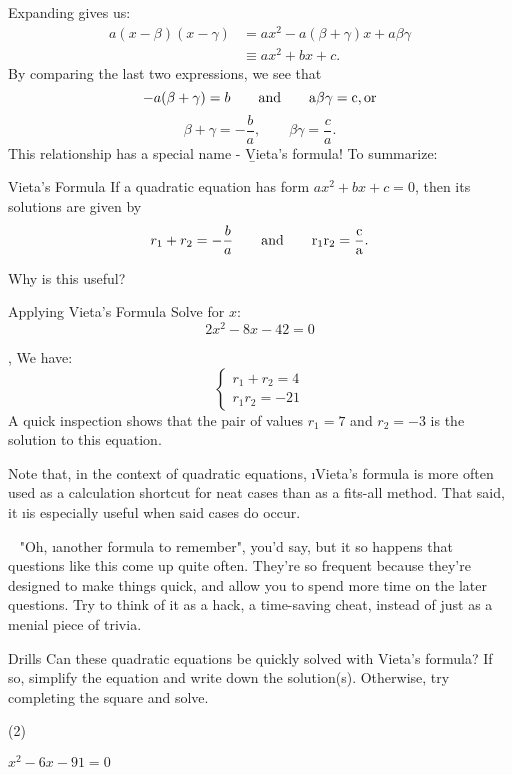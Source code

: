 \documentclass[../../main.tex]{subfiles}
\begin{document}
Expanding gives us:
\begin{align}
    a(x-\beta)(x-\gamma)
    &= ax^2-a(\beta+\gamma)x+a\beta\gamma \\
    &\equiv ax^2+bx+c.
\end{align}
By comparing the last two expressions, we see that
$$-a(\beta+\gamma)=b\qquad\rm{and}\qquad a\beta\gamma=c\rm{, or}$$
$$\beta+\gamma=-\frac{b}{a},\qquad\beta\gamma=\frac{c}{a}.$$
This relationship has a special name - \b{Vieta's formula}! To summarize:
\begin{theorem}{Vieta's Formula}
If a quadratic equation has form $ax^2+bx+c=0$, then its solutions are given by $$r_1+r_2=-\frac{b}{a}\qquad\rm{and}\qquad r_1r_2=\frac{c}{a}.$$
\end{theorem}

Why is this useful? %

\begin{example}{Applying Vieta's Formula}
Solve for $x$: $$2x^2-8x-42=0$$

\sep
We have:
$$\begin{cases}
        r_1+r_2=4 \\
        r_1r_2=-21
    \end{cases}$$
A quick inspection shows that the pair of values $r_1=7$ and $r_2=-3$ is the solution to this equation.
\end{example}
Note that, in the context of quadratic equations, \i{Vieta's formula is more often used as a calculation shortcut for neat cases than as a fits-all method.} That said, it \i{is} especially useful when said cases do occur.
\begin{insight}{~}
"Oh, \i{another} formula to remember", you'd say, but it so happens that questions like this come up quite often. They're so frequent because they're designed to make things quick, and allow you to spend more time on the later questions. Try to think of it as a hack, a time-saving cheat, instead of just as a menial piece of trivia.
\end{insight}

\begin{questions}{Drills}
Can these quadratic equations be quickly solved with Vieta's formula? If so, simplify the equation and write down the solution(s). Otherwise, try completing the square and solve.
\begin{question_set}(2)
    \item $x^2-6x-91=0$
    \item $ $
    \item $ $
    \item $ $
    \item $ $
    \item $ $
\end{question_set}
\end{questions}
\end{document}
